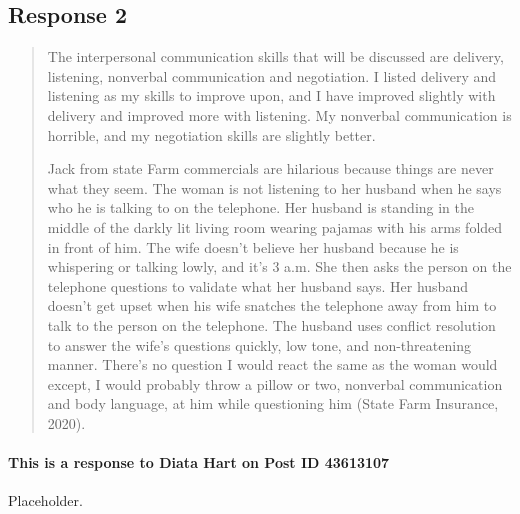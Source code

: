 
\subsection{Response 2}
  \begin{quotation}
    The interpersonal communication skills that will be discussed are delivery,
      listening, nonverbal communication and negotiation. I listed delivery and
      listening as my skills to improve upon, and I have improved slightly with
      delivery and improved more with listening. My nonverbal communication is
      horrible, and my negotiation skills are slightly better.

    Jack from state Farm commercials are hilarious because things are never
      what they seem. The woman is not listening to her husband when he says
      who he is talking to on the telephone. Her husband is standing in the
      middle of the darkly lit living room wearing pajamas with his arms folded
      in front of him. The wife doesn’t believe her husband because he is
      whispering or talking lowly, and it’s 3 a.m. She then asks the person on
      the telephone questions to validate what her husband says. Her husband
      doesn't get upset when his wife snatches the telephone away from him to
      talk to the person on the telephone. The husband uses conflict resolution
      to answer the wife's questions quickly, low tone, and non-threatening
      manner. There's no question I would react the same as the woman would
      except, I would probably throw a pillow or two, nonverbal communication
      and body language, at him while questioning him
      (State Farm Insurance, 2020).
  \end{quotation}

  \paragraph{This is a response to Diata Hart on Post ID 43613107}
    Placeholder.
